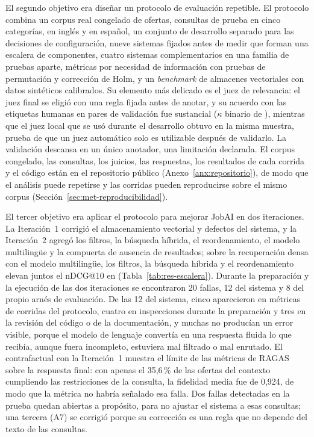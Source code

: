 El segundo objetivo era diseñar un protocolo de evaluación repetible. El protocolo combina un corpus real congelado de \cOfertas{} ofertas, \cConsultasPrueba{} consultas de prueba en cinco categorías, en inglés y en español, un conjunto de desarrollo separado para las decisiones de configuración, nueve sistemas fijados antes de medir que forman una escalera de componentes, cuatro sistemas complementarios en una familia de pruebas aparte, métricas por necesidad de información con pruebas de permutación y corrección de Holm, y un \textit{benchmark} de almacenes vectoriales con datos sintéticos calibrados. Su elemento más delicado es el juez de relevancia: el juez final se eligió con una regla fijada antes de anotar, y su acuerdo con las etiquetas humanas en \cParesValidacion{} pares de validación fue sustancial ($\kappa$ binario de \cKappaBinIC), mientras que el juez local que se usó durante el desarrollo obtuvo \cKappaLocal{} en la misma muestra, prueba de que un juez automático solo es utilizable después de validarlo. La validación descansa en un único anotador, una limitación declarada. El corpus congelado, las consultas, los juicios, las respuestas, los resultados de cada corrida y el código están en el repositorio público (Anexo~\ref{anx:repositorio}), de modo que el análisis puede repetirse y las corridas pueden reproducirse sobre el mismo corpus (Sección~\ref{sec:met-reproducibilidad}).

El tercer objetivo era aplicar el protocolo para mejorar JobAI en dos iteraciones. La Iteración~1 corrigió el almacenamiento vectorial y defectos del sistema, y la Iteración~2 agregó los filtros, la búsqueda híbrida, el reordenamiento, el modelo multilingüe y la compuerta de ausencia de resultados; sobre la recuperación densa con el modelo multilingüe, los filtros, la búsqueda híbrida y el reordenamiento elevan juntos el nDCG@10 en \cDifCompletaDensoIC{} (Tabla~\ref{tab:res-escalera}). Durante la preparación y la ejecución de las dos iteraciones se encontraron 20 fallas, 12 del sistema y 8 del propio arnés de evaluación. De las 12 del sistema, cinco aparecieron en métricas de corridas del protocolo, cuatro en inspecciones durante la preparación y tres en la revisión del código o de la documentación, y muchas no producían un error visible, porque el modelo de lenguaje convertía en una respuesta fluida lo que recibía, aunque fuera incompleto, estuviera mal filtrado o mal enrutado. El contrafactual con la Iteración~1 muestra el límite de las métricas de RAGAS sobre la respuesta final: con apenas el 35,6\,\% de las ofertas del contexto cumpliendo las restricciones de la consulta, la fidelidad media fue de 0,924, de modo que la métrica no habría señalado esa falla. Dos fallas detectadas en la prueba quedan abiertas a propósito, para no ajustar el sistema a esas consultas; una tercera (A7) se corrigió porque su corrección es una regla que no depende del texto de las consultas.

